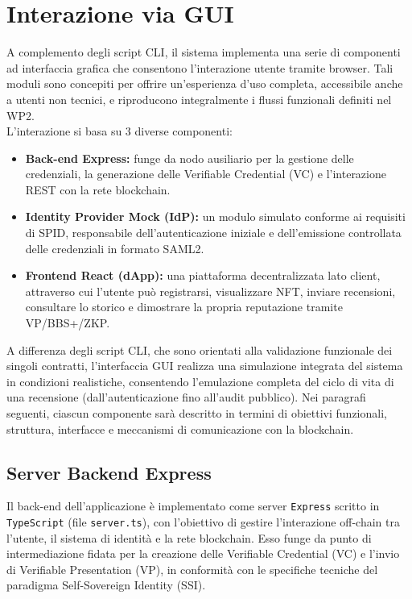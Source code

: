     \section{Interazione via GUI}
        A complemento degli script CLI, il sistema implementa una serie di componenti ad interfaccia grafica che consentono l'interazione utente tramite browser. Tali moduli sono concepiti per offrire un'esperienza d'uso completa, accessibile anche a utenti non tecnici, e riproducono integralmente i flussi funzionali definiti nel WP2. \\
        L'interazione si basa su 3 diverse componenti:
            \begin{itemize}
                \item \textbf{Back-end Express:} funge da nodo ausiliario per la gestione delle credenziali, la generazione delle Verifiable Credential (VC) e l'interazione REST con la rete blockchain.
                
                \item \textbf{Identity Provider Mock (IdP):} un modulo simulato conforme ai requisiti di SPID, responsabile dell’autenticazione iniziale e dell’emissione controllata delle credenziali in formato SAML2.
                
                \item \textbf{Frontend React (dApp):} una piattaforma decentralizzata lato client, attraverso cui l’utente può registrarsi, visualizzare NFT, inviare recensioni, consultare lo storico e dimostrare la propria reputazione tramite VP/BBS+/ZKP.
            \end{itemize}
        
        \noindent A differenza degli script CLI, che sono orientati alla validazione funzionale dei singoli contratti, l’interfaccia GUI realizza una simulazione integrata del sistema in condizioni realistiche, consentendo l’emulazione completa del ciclo di vita di una recensione (dall’autenticazione fino all’audit pubblico). Nei paragrafi seguenti, ciascun componente sarà descritto in termini di obiettivi funzionali, struttura, interfacce e meccanismi di comunicazione con la blockchain.

        \subsection{Server Backend Express}
            Il back-end dell'applicazione è implementato come server \texttt{Express} scritto in \texttt{TypeScript} (file \texttt{server.ts}), con l'obiettivo di gestire l'interazione off-chain tra l'utente, il sistema di identità e la rete blockchain. Esso funge da punto di intermediazione fidata per la creazione delle Verifiable Credential (VC) e l’invio di Verifiable Presentation (VP), in conformità con le specifiche tecniche del paradigma Self-Sovereign Identity (SSI).
            
